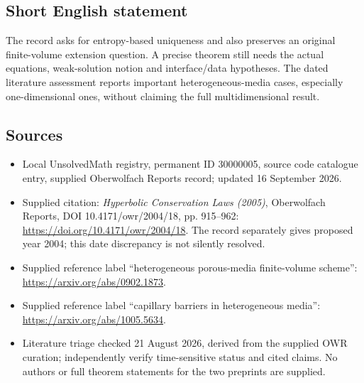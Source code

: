 \documentclass[11pt]{article}
\begin{document}
\subsection{Short English statement}
The record asks for entropy-based uniqueness and also preserves an original finite-volume extension question. A precise theorem still needs the actual equations, weak-solution notion and interface/data hypotheses. The dated literature assessment reports important heterogeneous-media cases, especially one-dimensional ones, without claiming the full multidimensional result.
\subsection{Sources}
\begin{itemize}
\item Local UnsolvedMath registry, permanent ID 30000005, source code catalogue entry, supplied Oberwolfach Reports record; updated 16 September 2026.
\item Supplied citation: \emph{Hyperbolic Conservation Laws (2005)}, Oberwolfach Reports, DOI 10.4171/owr/2004/18, pp. 915--962: \url{https://doi.org/10.4171/owr/2004/18}. The record separately gives proposed year 2004; this date discrepancy is not silently resolved.
\item Supplied reference label ``heterogeneous porous-media finite-volume scheme'': \url{https://arxiv.org/abs/0902.1873}.
\item Supplied reference label ``capillary barriers in heterogeneous media'': \url{https://arxiv.org/abs/1005.5634}.
\item Literature triage checked 21 August 2026, derived from the supplied OWR curation; independently verify time-sensitive status and cited claims. No authors or full theorem statements for the two preprints are supplied.
\end{itemize}
\end{document}
